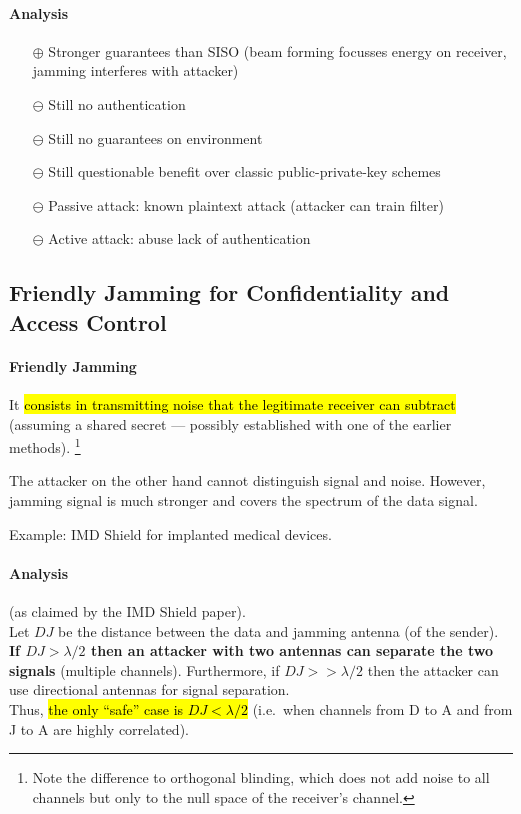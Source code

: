 \paragraph{Analysis}
\begin{itemize}
	\item[$\oplus$] Stronger guarantees than SISO (beam forming focusses energy on receiver, jamming interferes with attacker)
	\item[$\ominus$] Still no authentication
	\item[$\ominus$] Still no guarantees on environment
	\item[$\ominus$] Still questionable benefit over classic public-private-key
		schemes
	\item[$\ominus$] Passive attack: known plaintext attack (attacker can train filter)
	\item[$\ominus$] Active attack: abuse lack of authentication
\end{itemize}


\subsection{Friendly Jamming for Confidentiality and Access Control}

\paragraph{Friendly Jamming} It \hl{consists in transmitting noise that the legitimate receiver can subtract} (assuming a shared secret --- possibly established with one of the earlier methods).%
\footnote{Note the difference to orthogonal blinding, which does not add noise to all channels but only to the null space of the receiver's channel.}

The attacker on the other hand cannot distinguish signal and noise. However, jamming signal is much stronger and covers the spectrum of the data signal.

Example: IMD Shield for implanted medical devices.

\paragraph{Analysis} (as claimed by the IMD Shield paper). \\
Let $DJ$ be the distance between the data and jamming antenna (of the sender).
\textbf{If $DJ > \lambda/2$ then an attacker with two antennas can separate the two signals} (multiple channels).
Furthermore, if $DJ >> \lambda/2$ then the attacker can use directional antennas for signal separation.
\\
Thus, \hl{the only ``safe'' case is $DJ < \lambda/2$} (i.e.\ when channels from D to A and from J to A are highly correlated).

